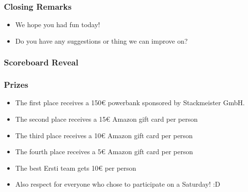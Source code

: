 \documentclass{beamer}
\begin{document}
\begin{frame}
    \frametitle{Closing Remarks}
    \begin{itemize}
        \item We hope you had fun today!
        \item Do you have any suggestions or thing we can improve on?
    \end{itemize}
\end{frame}

\begin{frame}
    \frametitle{Scoreboard Reveal}
\end{frame}

\begin{frame}
    \frametitle{Prizes}
    \begin{itemize}
        \item The first place receives a 150€ powerbank sponsored by Stackmeister GmbH.
        \item The second place receives a 15€ Amazon gift card per person
        \item The third place receives a 10€ Amazon gift card per person
        \item The fourth place receives a 5€ Amazon gift card per person
        \item The best Ersti team gets 10€ per person
        \item Also respect for everyone who chose to participate on a Saturday! :D
    \end{itemize}
\end{frame}
\end{document}

